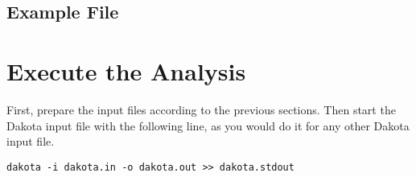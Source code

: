 \documentclass[11pt, a4paper, DIV=14]{scrartcl}
\begin{document}
\subsection{Example File}


\section{Execute the Analysis}
First, prepare the input files according to the previous sections. Then start the Dakota input file with the following line, as you would do it for any other Dakota input file.
\begin{lstlisting}
dakota -i dakota.in -o dakota.out >> dakota.stdout
\end{lstlisting}

  

\end{document}
